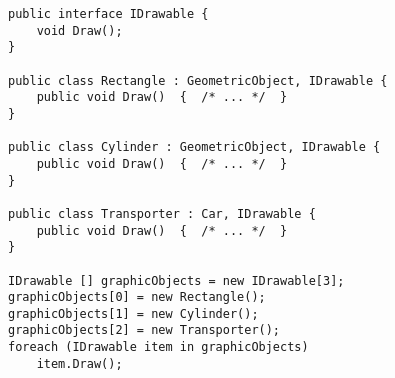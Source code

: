 \begin{lstlisting}[language={[Sharp]C}]
public interface IDrawable {
	void Draw();
}

public class Rectangle : GeometricObject, IDrawable {
	public void Draw()  {  /* ... */  }
}

public class Cylinder : GeometricObject, IDrawable {
	public void Draw()  {  /* ... */  }
}

public class Transporter : Car, IDrawable {
	public void Draw()  {  /* ... */  }
}

IDrawable [] graphicObjects = new IDrawable[3];
graphicObjects[0] = new Rectangle();
graphicObjects[1] = new Cylinder();
graphicObjects[2] = new Transporter();
foreach (IDrawable item in graphicObjects)
	item.Draw();
\end{lstlisting}